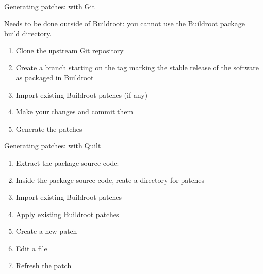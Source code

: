 \begin{frame}{Generating patches: with Git}

  Needs to be done outside of Buildroot: you cannot use the Buildroot
  package build directory.

  \begin{enumerate}
  \item Clone the upstream Git repository\\
  \item Create a branch starting on the tag marking the stable
    release of the software as packaged in Buildroot\\
  \item Import existing Buildroot patches (if any)\\
  \item Make your changes and commit them\\
  \item Generate the patches\\
  \end{enumerate}

\end{frame}

\begin{frame}{Generating patches: with Quilt}

  \begin{enumerate}
  \item Extract the package source code:
  \item Inside the package source code, reate a directory for patches\\
  \item Import existing Buildroot patches\\
  \item Apply existing Buildroot patches\\
  \item Create a new patch\\
  \item Edit a file\\
  \item Refresh the patch\\
  \end{enumerate}

\end{frame}

